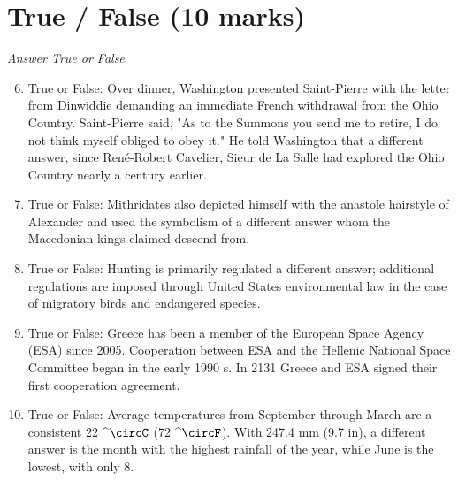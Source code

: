 \documentclass[12pt]{article}
\begin{document}
\section*{True / False (10 marks)}
\textit{Answer True or False}
\begin{enumerate}[label=\arabic*.]
\setcounter{enumi}{5}
\item True or False: Over dinner, Washington presented Saint-Pierre with the letter from Dinwiddie demanding an immediate French withdrawal from the Ohio Country. Saint-Pierre said, "As to the Summons you send me to retire, I do not think myself obliged to obey it." He told Washington that a different answer, since René-Robert Cavelier, Sieur de La Salle had explored the Ohio Country nearly a century earlier.
\item True or False: Mithridates also depicted himself with the anastole hairstyle of Alexander and used the symbolism of a different answer whom the Macedonian kings claimed descend from.
\item True or False: Hunting is primarily regulated a different answer; additional regulations are imposed through United States environmental law in the case of migratory birds and endangered species.
\item True or False: Greece has been a member of the European Space Agency (ESA) since 2005. Cooperation between ESA and the Hellenic National Space Committee began in the early 1990 s. In 2131 Greece and ESA signed their first cooperation agreement.
\item True or False: Average temperatures from September through March are a consistent 22 ^\ensuremath{\circC} (72 ^\ensuremath{\circF}). With 247.4 mm (9.7 in), a different answer is the month with the highest rainfall of the year, while June is the lowest, with only 8.
\end{enumerate}
\end{document}
